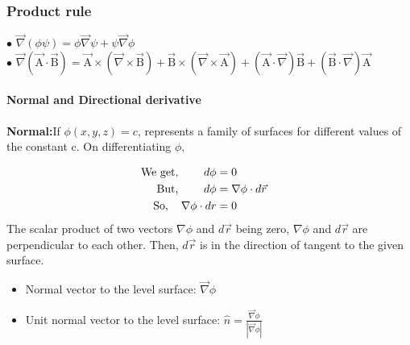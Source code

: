 \subsubsection{Product rule}$ \bullet$ $\vec{\nabla}(\phi \psi)=\phi \vec{\nabla} \psi+\psi \vec{\nabla} \phi$
\\$ \bullet$ $\vec{\nabla}(\overrightarrow{\mathrm{A}} \cdot \overrightarrow{\mathrm{B}})=\overrightarrow{\mathrm{A}} \times(\vec{\nabla} \times \overrightarrow{\mathrm{B}})+\overrightarrow{\mathrm{B}} \times(\vec{\nabla} \times \overrightarrow{\mathrm{A}})+(\overrightarrow{\mathrm{A}} \cdot \vec{\nabla}) \overrightarrow{\mathrm{B}}+(\overrightarrow{\mathrm{B}} \cdot \vec{\nabla}) \overrightarrow{\mathrm{A}}$
\\
\\\textbf{Normal and Directional derivative}
 \\\\\textbf{ Normal:}\newline If $\phi(x, y, z)=c$,  represents a family of surfaces for different values of the constant
 c. On differentiating $\phi,$ 

\begin{align*}
	 \text{We get,} \hspace{0.8cm}  d \phi&=0
	\\\text{But,} \hspace{0.8cm} d \phi&=\nabla \phi \cdot d \vec{r} \quad \\
	\text{So,} \hspace{0.05cm} \quad \nabla \phi \cdot d r&=0
	\end{align*}
The scalar product of two vectors $\nabla \phi$ and $d \vec{r}$ being zero, $\nabla \phi$ and $d \vec{r}$ are perpendicular to each other. Then, $d \vec{r}$ is in the direction of tangent to the given surface.

	\begin{itemize}
	\item  Normal vector to the level surface\hspace{1.2cm}: $\vec{\nabla} \phi$ 
	\item   Unit normal vector to the level surface\quad: $\hat{n}=\frac{\vec{\nabla} \phi}{|\vec{\nabla} \phi|}$
\end{itemize}
	
